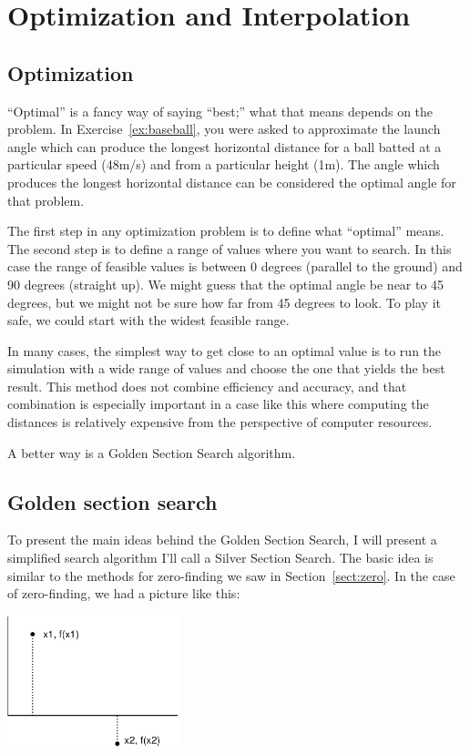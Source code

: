 \documentclass[
]{book}
\begin{document}
\chapter{Optimization and Interpolation}
\section{Optimization}

``Optimal'' is a fancy way of saying ``best;'' what that means depends on the problem.
In Exercise~\ref{ex:baseball}, you were asked to approximate the launch angle which
can produce the longest horizontal distance for a ball batted at a particular speed (48m/s)
and from a particular height (1m).  The angle which produces the longest horizontal distance
can be considered the
optimal angle for that problem.

The first step in any optimization problem is to define
what ``optimal'' means.  The second step is to define a range of
values where you want to search. In this case the range of
feasible values is between 0 degrees (parallel to the ground)
and 90 degrees (straight up).  We might guess that the
optimal angle be near to 45 degrees, but we might not be sure
how far from 45 degrees to look.  To play it safe, we could
start with the widest feasible range.

In many cases,
the simplest way to get close to an optimal value is to run the
simulation with a wide range of values and choose the one
that yields the best result.  This
method does not combine efficiency and accuracy,
and that combination is especially important in a case like this where
computing the distances is relatively expensive from the perspective
of computer resources.

A better way is a Golden Section Search algorithm.

\section{Golden section search}

To present the main ideas behind
the Golden Section Search, I will present a simplified
search algorithm I'll call a Silver Section Search.  The basic idea is similar to
the methods for zero-finding we saw in Section~\ref{sect:zero}.  In the
case of zero-finding, we had a picture like this:

\beforefig \centerline{\includegraphics[height=1.5in]{figs/secant.eps}}
\end{document}

